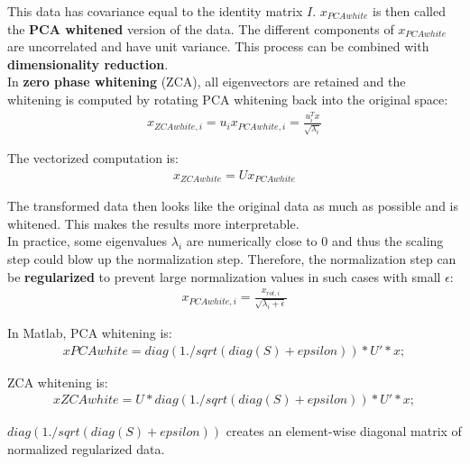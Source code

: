 \documentclass{report}
\begin{document}
This data has covariance equal to the identity matrix $I$. $x_{PCAwhite}$ is then called the {\bf PCA whitened} version of the data.
The different components of $x_{PCAwhite}$ are uncorrelated and have unit variance.
This process can be combined with {\bf dimensionality reduction}.
\\
In {\bf zero phase whitening} (ZCA), all eigenvectors are retained and the whitening is computed by rotating PCA whitening back into the original space:
\begin{align*}
x_{ZCAwhite,i} = u_i x_{PCAwhite,i} = \frac{u_i^T x}{\sqrt{\lambda_i}}
\end{align*}

The vectorized computation is:
\begin{align*}
x_{ZCAwhite} = Ux_{PCAwhite}
\end{align*}

The transformed data then looks like the original data as much as possible and is whitened. This makes the results more interpretable.
\\
In practice, some eigenvalues $\lambda_i$ are numerically close to 0 and thus the scaling step could blow up the normalization step.
Therefore, the normalization step can be {\bf regularized} to prevent large normalization values in such cases with small $\epsilon$:
\begin{align*}
x_{PCAwhite,i} = \frac{x_{rot,i}}{\sqrt{\lambda_i+\epsilon}}
\end{align*}

In Matlab, PCA whitening is:
\begin{align*}
xPCAwhite = diag(1./sqrt(diag(S) + epsilon)) * U' * x;
\end{align*}

ZCA whitening is:
\begin{align*}
xZCAwhite = U * diag(1./sqrt(diag(S) + epsilon)) * U' * x;
\end{align*}

$diag(1./sqrt(diag(S) + epsilon))$ creates an element-wise diagonal matrix of normalized regularized data.
\end{document}
